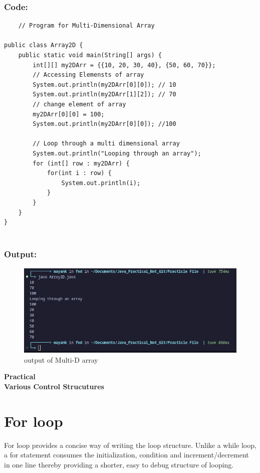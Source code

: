 \documentclass[a4paper,12pt]{article}
\newcounter{practicalno} %
\newcommand{\practicaltitle}[1]{
    \stepcounter{practicalno} %
    \newpage
    \begin{center}
        \vspace{1cm}
        \Large\textbf{Practical \thepracticalno} \\
        \vspace{0.5cm}
        \Large\textbf{#1} %
        \normalsize\vspace{1cm}
    \end{center}
}
\begin{document}
\subsubsection{Code: }
\begin{lstlisting}
    // Program for Multi-Dimensional Array

public class Array2D {
    public static void main(String[] args) {
        int[][] my2DArr = {{10, 20, 30, 40}, {50, 60, 70}};
        // Accessing Elemensts of array
        System.out.println(my2DArr[0][0]); // 10
        System.out.println(my2DArr[1][2]); // 70
        // change element of array
        my2DArr[0][0] = 100;
        System.out.println(my2DArr[0][0]); //100

        // Loop through a multi dimensional array
        System.out.println("Looping through an array");
        for (int[] row : my2DArr) {
            for(int i : row) {
                System.out.println(i);
            }
        }
    }
}
  
\end{lstlisting}
\subsubsection{Output: }
\begin{figure}[H]
    \centering
    \includegraphics[width=0.9\linewidth]{images/output3.png}
    \caption{output of Multi-D array}
    \label{fig:sample_image}
\end{figure}

\setcounter{section}{0}

\practicaltitle{Various Control Strucutures}

\section{For loop}
For loop provides a concise way of writing the loop structure. Unlike a while loop, a
for statement consumes the initialization, condition and increment/decrement in one line
thereby providing a shorter, easy to debug structure of looping.
\end{document}
